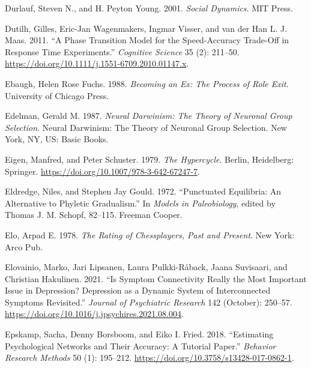 \documentclass[
  a4paper,
  DIV=11,
  numbers=noendperiod,
  oneside]{scrreprt}
\newlength{\cslhangindent}
\newenvironment{CSLReferences}[2] %
 {\begin{list}{}{%
  \setlength{\itemindent}{0pt}
  \setlength{\leftmargin}{0pt}
  \setlength{\parsep}{0pt}
  \ifodd #1
   \setlength{\leftmargin}{\cslhangindent}
   \setlength{\itemindent}{-1\cslhangindent}
  \fi
  \setlength{\itemsep}{#2\baselineskip}}}
 {\end{list}}
\begin{document}
\begin{CSLReferences}{1}{0}
Durlauf, Steven N., and H. Peyton Young. 2001. \emph{Social {Dynamics}}.
{MIT Press}.

Dutilh, Gilles, Eric-Jan Wagenmakers, Ingmar Visser, and van der Han L.
J. Maas. 2011. {``A {Phase Transition Model} for the {Speed-Accuracy
Trade-Off} in {Response Time Experiments}.''} \emph{Cognitive Science}
35 (2): 211--50. \url{https://doi.org/10.1111/j.1551-6709.2010.01147.x}.

Ebaugh, Helen Rose Fuchs. 1988. \emph{Becoming an Ex: The Process of
Role Exit}. University of Chicago Press.

Edelman, Gerald M. 1987. \emph{Neural {Darwinism}: {The} Theory of
Neuronal Group Selection}. Neural {Darwinism}: {The} Theory of Neuronal
Group Selection. {New York, NY, US}: {Basic Books}.

Eigen, Manfred, and Peter Schuster. 1979. \emph{The {Hypercycle}}.
{Berlin, Heidelberg}: {Springer}.
\url{https://doi.org/10.1007/978-3-642-67247-7}.

Eldredge, Niles, and Stephen Jay Gould. 1972. {``Punctuated
{Equilibria}: {An Alternative} to {Phyletic Gradualism}.''} In
\emph{Models in {Paleobiology}}, edited by Thomas J. M. Schopf, 82--115.
{Freeman Cooper}.

Elo, Arpad E. 1978. \emph{The Rating of Chessplayers, Past and Present}.
{New York}: {Arco Pub}.

Elovainio, Marko, Jari Lipsanen, Laura Pulkki-Råback, Jaana Suvisaari,
and Christian Hakulinen. 2021. {``Is Symptom Connectivity Really the
Most Important Issue in Depression? {Depression} as a Dynamic System of
Interconnected Symptoms Revisited.''} \emph{Journal of Psychiatric
Research} 142 (October): 250--57.
\url{https://doi.org/10.1016/j.jpsychires.2021.08.004}.

Epskamp, Sacha, Denny Borsboom, and Eiko I. Fried. 2018. {``Estimating
Psychological Networks and Their Accuracy: {A} Tutorial Paper.''}
\emph{Behavior Research Methods} 50 (1): 195--212.
\url{https://doi.org/10.3758/s13428-017-0862-1}.


\end{CSLReferences}
\end{document}
